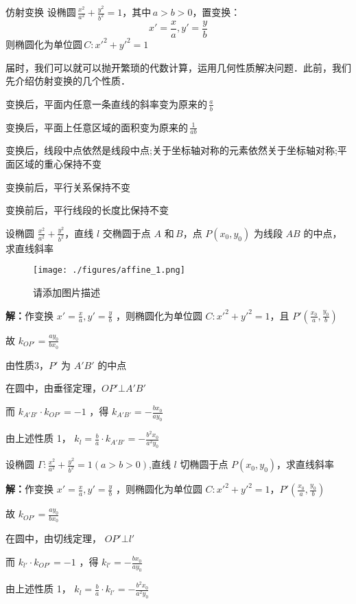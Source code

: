 \begin{definition}{仿射变换}
设椭圆\,\(\frac{x^2}{a^2}+\frac{y^2}{b^2}=1\)，其中\,\(a>b>0\)，置变换：
$$x'=\frac{x}{a},y'=\frac{y}{b}$$
则椭圆化为单位圆\,\(C:x'^2+y'^2=1\)
\end{definition}
届时，我们可以就可以抛开繁琐的代数计算，运用几何性质解决问题．此前，我们先介绍仿射变换的几个性质．
\begin{lemma}{}
变换后，平面内任意一条直线的斜率变为原来的\,\(\frac{a}{b}\)
\end{lemma}
\begin{lemma}{}
变换后，平面上任意区域的面积变为原来的\,\(\frac1{ab}\)
\end{lemma}
\begin{lemma}{}
变换后，线段中点依然是线段中点;关于坐标轴对称的元素依然关于坐标轴对称;平面区域的重心保持不变
\end{lemma}
\begin{lemma}{}
变换前后，平行关系保持不变
\end{lemma}
\begin{lemma}{}
变换前后，平行线段的长度比保持不变
\end{lemma}
\begin{corollary}{}
设椭圆 \(\frac{x^2}{a^2}+\frac{y^2}{b^2}\)，直线 \(l\) 交椭圆于点 \(A\) 和\,\(B\)，点 \(P(x_0,y_0)\) 为线段 \(AB\) 的中点，求直线斜率
\begin{figure}[ht]
\centering
\texttt{[image: ./figures/affine\_1.png]}
\caption{请添加图片描述} \label{affine_fig1}
\end{figure}

\textbf{解：}作变换 \(x'=\frac{x}{a},y'=\frac{y}{b}\) ，则椭圆化为单位圆 \(C:x'^2+y'^2=1\)，且 \(P'\left(\frac{x_0}{a},\frac{y_0}{b}\right)\)

故 \(k_{OP'}=\frac{ay_0}{bx_0}\)

由性质3，\(P'\) 为 \(A'B'\) 的中点

在圆中，由垂径定理，\(OP'\bot A'B'\)

而 \(k_{A'B'}\cdot k_{OP'}=-1\) ，得 \(k_{A'B'}=-\frac{bx_0}{ay_0}\)

由上述性质 1， \(k_l=\frac{b}{a}\cdot k_{A'B'}=-\frac{b^2x_0}{a^2y_0}\)
\end{corollary}
\begin{corollary}{}
设椭圆   \(\Gamma:\frac{x^2}{a^2}+\frac{y^2}{b^2}=1(a>b>0)\),直线 \(l\) 切椭圆于点 \(P(x_0,y_0)\)，求直线斜率 

\textbf{解：}作变换 \(x'=\frac{x}{a},y'=\frac{y}{b}\) ，则椭圆化为单位圆 \(C:x'^2+y'^2=1\)，\(P'\left(\frac{x_0}{a},\frac{y_0}{b}\right)\) 

故  \(k_{OP'}=\frac{ay_0}{bx_0}\) 

在圆中，由切线定理， \(OP'\bot l'\) 

而  \(k_{l'}\cdot k_{OP'}=-1\) ，得 \(k_{l'}=-\frac{bx_0}{ay_0}\) 

由上述性质 1， \(k_l=\frac{b}{a}\cdot k_{l'}=-\frac{b^2x_0}{a^2y_0}\) 

\end{corollary}

